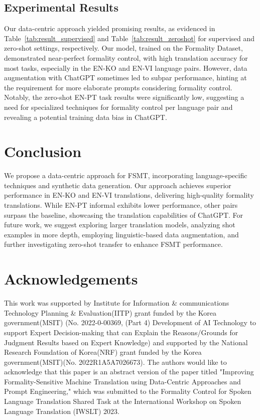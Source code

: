 \documentclass{article}
\theoremstyle{plain}
\theoremstyle{definition}
\theoremstyle{remark}
\begin{document}
\subsection{Experimental Results}
Our data-centric approach yielded promising results, as evidenced in Table~\ref{tab:result_supervised} and Table~\ref{tab:result_zeroshot} for supervised and zero-shot settings, respectively. Our model, trained on the Formality Dataset, demonstrated near-perfect formality control, with high translation accuracy for most tasks, especially in the EN-KO and EN-VI language pairs. However, data augmentation with ChatGPT sometimes led to subpar performance, hinting at the requirement for more elaborate prompts considering formality control. Notably, the zero-shot EN-PT task results were significantly low, suggesting a need for specialized techniques for formality control per language pair and revealing a potential training data bias in ChatGPT.



\section{Conclusion}
We propose a data-centric approach for FSMT, incorporating language-specific techniques and synthetic data generation. Our approach achieves superior performance in EN-KO and EN-VI translations, delivering high-quality formality translations. While EN-PT informal exhibits lower performance, other pairs surpass the baseline, showcasing the translation capabilities of ChatGPT. For future work, we suggest exploring larger translation models, analyzing shot examples in more depth, employing linguistic-based data augmentation, and further investigating zero-shot transfer to enhance FSMT performance.

\clearpage
\newpage
\section*{Acknowledgements}
This work was supported by Institute for Information \& communications Technology Planning \& Evaluation(IITP) grant funded by the Korea government(MSIT) (No. 2022-0-00369, (Part 4) Development of AI Technology to support Expert Decision-making that can Explain the Reasons/Grounds for Judgment Results based on Expert Knowledge) and supported by the National Research Foundation of Korea(NRF) grant funded by the Korea government(MSIT)(No. 2022R1A5A7026673). The authors would like to acknowledge that this paper is an abstract version of the paper titled "Improving Formality-Sensitive Machine Translation using Data-Centric Approaches and Prompt Engineering," which was submitted to the Formality Control for Spoken Language Translation Shared Task at the International Workshop on Spoken Language Translation (IWSLT) 2023.
\end{document}
